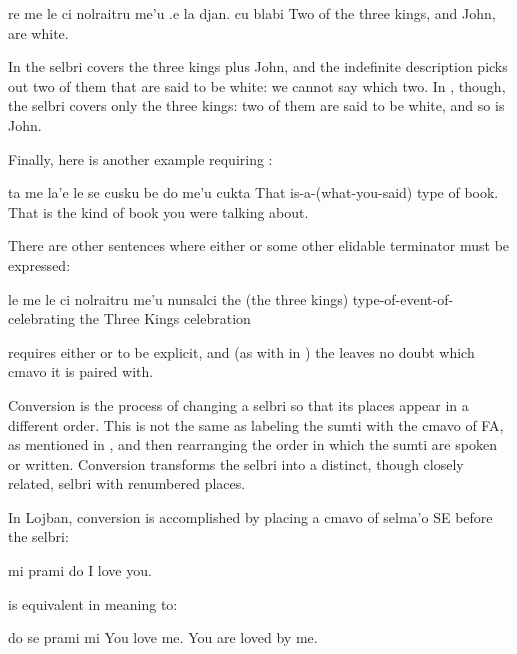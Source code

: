\begin{example}
re me le ci nolraitru me'u .e la djan. cu blabi\n
Two of the three kings, and John, are white.
\end{example}

In  the  selbri
    covers the three kings plus John, and the indefinite
    description picks out two of them that are said to be white: we
    cannot say which two. In ,
    though, the  selbri covers only the three kings: two of
    them are said to be white, and so is John.

Finally, here is another example requiring :
\begin{example}
ta me la'e le se cusku be do me'u cukta\n
That  is-a-(what-you-said) type of book.\n
That is the kind of book you were talking about.
\end{example}

There are other sentences where either  or some
    other elidable terminator must be expressed:
\begin{example}
le me le ci nolraitru  me'u nunsalci\n
the (the three kings) type-of-event-of-celebrating\n
the Three Kings celebration
\end{example}

{\noindent}requires either  or  to be explicit, and (as with
     in ) the  leaves no
    doubt which cmavo it is paired with.



Conversion is the process of changing a selbri so that its
    places appear in a different order. This is not the same as
    labeling the sumti with the cmavo of FA, as mentioned in , and then rearranging the order in
    which the sumti are spoken or written. Conversion transforms
    the selbri into a distinct, though closely related, selbri with
    renumbered places.

In Lojban, conversion is accomplished by placing a cmavo of
    selma'o SE before the selbri:

\begin{example}
mi prami do\n
I love you.
\end{example}

{\noindent}is equivalent in meaning to:
\begin{example}
do se prami mi\n
You  love me.\n
You are loved by me.
\end{example}

